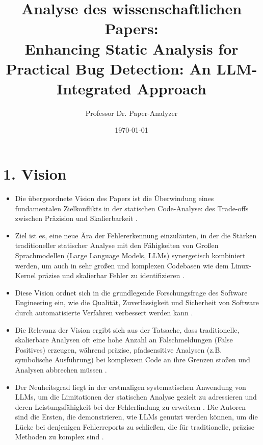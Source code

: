 \documentclass{article}
\begin{document}
\title{Analyse des wissenschaftlichen Papers:\\ \textbf{Enhancing Static Analysis for Practical Bug Detection: An LLM-Integrated Approach}}
\author{Professor Dr. Paper-Analyzer}
\date{\today}
\maketitle

\section*{1. Vision}
\begin{itemize}
    \item Die übergeordnete Vision des Papers ist die Überwindung eines fundamentalen Zielkonflikts in der statischen Code-Analyse: des Trade-offs zwischen Präzision und Skalierbarkeit \cite{Li2024}.
    \item Ziel ist es, eine neue Ära der Fehlererkennung einzuläuten, in der die Stärken traditioneller statischer Analyse mit den Fähigkeiten von Großen Sprachmodellen (Large Language Models, LLMs) synergetisch kombiniert werden, um auch in sehr großen und komplexen Codebasen wie dem Linux-Kernel präzise und skalierbar Fehler zu identifizieren \cite{Li2024}.
    \item Diese Vision ordnet sich in die grundlegende Forschungsfrage des Software Engineering ein, wie die Qualität, Zuverlässigkeit und Sicherheit von Software durch automatisierte Verfahren verbessert werden kann \cite{Li2024}.
    \item Die Relevanz der Vision ergibt sich aus der Tatsache, dass traditionelle, skalierbare Analysen oft eine hohe Anzahl an Falschmeldungen (False Positives) erzeugen, während präzise, pfadsensitive Analysen (z.B. symbolische Ausführung) bei komplexem Code an ihre Grenzen stoßen und Analysen abbrechen müssen \cite{Li2024}.
    \item Der Neuheitsgrad liegt in der erstmaligen systematischen Anwendung von LLMs, um die Limitationen der statischen Analyse gezielt zu adressieren und deren Leistungsfähigkeit bei der Fehlerfindung zu erweitern \cite{Li2024}. Die Autoren sind die Ersten, die demonstrieren, wie LLMs genutzt werden können, um die Lücke bei denjenigen Fehlerreports zu schließen, die für traditionelle, präzise Methoden zu komplex sind \cite{Li2024}.
\end{itemize}
\end{document}
